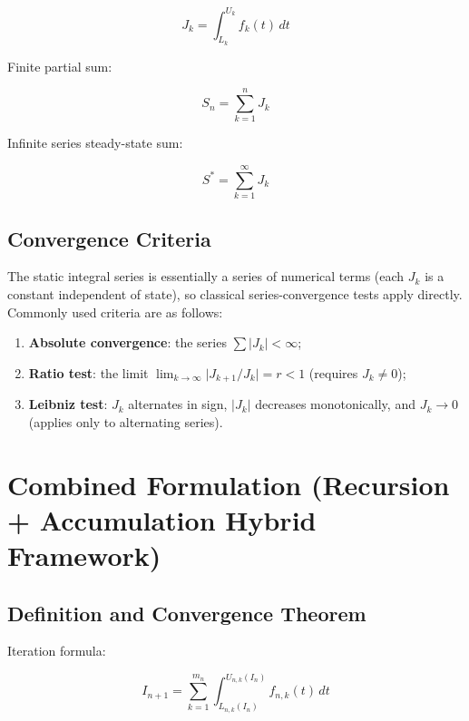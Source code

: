 \documentclass[11pt,a4paper]{amsart}
\begin{document}
\begin{equation}
J_k = \int_{L_k}^{U_k} f_k(t) \, dt
\end{equation}

Finite partial sum:

\begin{equation}
S_n = \sum_{k=1}^n J_k
\end{equation}

Infinite series steady-state sum:

\begin{equation}
S^* = \sum_{k=1}^\infty J_k
\end{equation}

\subsection{Convergence Criteria}

The static integral series is essentially a series of numerical terms (each $J_k$ is a constant independent of state), so classical series-convergence tests apply directly. Commonly used criteria are as follows:

\begin{enumerate}
\item \textbf{Absolute convergence}: the series $\sum |J_k| < \infty$;
\item \textbf{Ratio test}: the limit $\lim_{k \to \infty} \big|J_{k+1}/J_k \big| = r < 1$ (requires $J_k \ne 0$);
\item \textbf{Leibniz test}: $J_k$ alternates in sign, $|J_k|$ decreases monotonically, and $J_k \to 0$ (applies only to alternating series).
\end{enumerate}

\section{Combined Formulation (Recursion + Accumulation Hybrid Framework)}

\subsection{Definition and Convergence Theorem}

Iteration formula:

\begin{equation}
\label{eq:combined}
I_{n+1} = \sum_{k=1}^{m_n} \int_{L_{n,k}(I_n)}^{U_{n,k}(I_n)} f_{n,k}(t) \, dt
\end{equation}
\end{document}
